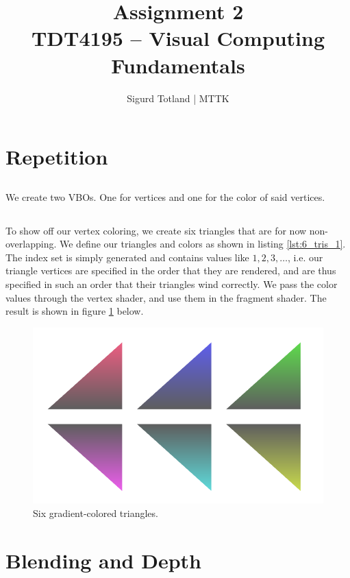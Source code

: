 \documentclass[]{article}
\title{\Huge{Assignment 2} \\ \Large{TDT4195 – Visual Computing Fundamentals}}
\author{Sigurd Totland | MTTK}
\begin{document}
\maketitle
\begin{multicols}{2}
\section{Repetition}
\subsection{}
We create two VBOs. One for vertices and one for the color of said vertices.

\subsection{}
To show off our vertex coloring, we create six triangles that are for now non-overlapping. We define our triangles and colors as shown in listing \ref{lst:6_tris_1}. The index set is simply generated and contains values like $1,2,3,\dots$, i.e. our triangle vertices are specified in the order that they are rendered, and are thus specified in such an order that their triangles wind correctly. We pass the color values through the vertex shader, and use them in the fragment shader. The result is shown in figure \ref{fig:6_tris_1} below.
\begin{figure}[H]
\centering
\includegraphics[width=\columnwidth]{6_color_tris.png}
\caption{Six gradient-colored triangles.}
\label{fig:6_tris_1}
\end{figure}

\section{Blending and Depth}

\end{multicols}
\end{document}
